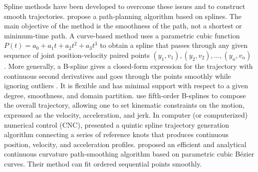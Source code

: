 Spline methods have been developed to overcome these issues and to construct smooth trajectories.  \cite{magid2006spline} propose a path-planning algorithm based on splines. The main objective of the method is the smoothness of the path, not a shortest or minimum-time path. A curve-based method uses a parametric cubic function $P(t)=a_0+a_1t+a_2t^2+a_3t^3$ to obtain a spline that passes through any given sequence of joint position-velocity paired points $(y_1, v_1), (y_2, v_2), \ldots, (y_n,v_n)$ \citep{yu2004curve}. More generally, a B-spline gives a closed-form expression for the trajectory with continuous second derivatives and goes through the points smoothly while ignoring outliers \citep{komoriya1989trajectory, ben2004geometric}. It is flexible and has minimal support with respect to a given degree, smoothness, and domain partition. \cite{gasparetto2007new} use fifth-order B-splines to compose the overall trajectory, allowing one to set kinematic constraints on the motion, expressed as the velocity, acceleration, and jerk. In computer (or computerized) numerical control (CNC), \cite{erkorkmaz2001high} presented a quintic spline trajectory generation algorithm connecting a series of reference knots that produces continuous position, velocity, and acceleration profiles. \cite{yang2010analytical} proposed an efficient and analytical continuous curvature path-smoothing algorithm based on parametric cubic B\'{e}zier curves. Their method can fit ordered sequential points smoothly. 


